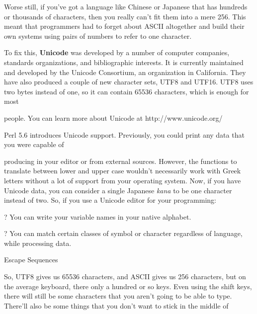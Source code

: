 \documentclass[a4paper,11pt]{book}
\begin{document}
\noindent 

\noindent Worse still, if you've got a language like Chinese or Japanese that has hundreds or thousands of characters, then you really can't fit them into a mere 256. This meant that programmers had to forget about ASCII altogether and build their own systems using pairs of numbers to refer to one character.

\noindent 

\noindent To fix this, \textbf{Unicode }was developed by a number of computer companies, standards organizations, and bibliographic interests. It is currently maintained and developed by the Unicode Consortium, an organization in California. They have also produced a couple of new character sets, UTF8 and UTF16. UTF8 uses two bytes instead of one, so it can contain 65536 characters, which is enough for most

\noindent people. You can learn more about Unicode at http://www.unicode.org/

\noindent 

\noindent 

\noindent Perl 5.6 introduces Unicode support. Previously, you could print any data that you were capable of

\noindent producing in your editor or from external sources. However, the functions to translate between lower and upper case wouldn't necessarily work with Greek letters without a lot of support from your operating system. Now, if you have Unicode data, you can consider a single Japanese \textit{kana }to be one character instead of two. So, if you use a Unicode editor for your programming:

\noindent 

\noindent ? You can write your variable names in your native alphabet.

\noindent 

\noindent ? You can match certain classes of symbol or character regardless of language, while processing data.

\noindent 

\noindent 

\noindent Escape Sequences

\noindent 

\noindent So, UTF8 gives us 65536 characters, and ASCII gives us 256 characters, but on the average keyboard, there only a hundred or so keys. Even using the shift keys, there will still be some characters that you aren't going to be able to type. There'll also be some things that you don't want to stick in the middle of
\end{document}
